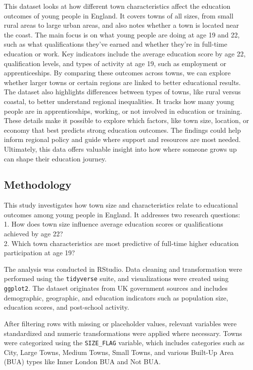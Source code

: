 \documentclass[
  letterpaper,
  DIV=11,
  numbers=noendperiod]{scrartcl}
\begin{document}
This dataset looks at how different town characteristics affect the
education outcomes of young people in England. It covers towns of all
sizes, from small rural areas to large urban areas, and also notes
whether a town is located near the coast. The main focus is on what
young people are doing at age 19 and 22, such as what qualifications
they've earned and whether they're in full-time education or work. Key
indicators include the average education score by age 22, qualification
levels, and types of activity at age 19, such as employment or
apprenticeships. By comparing these outcomes across towns, we can
explore whether larger towns or certain regions are linked to better
educational results. The dataset also highlights differences between
types of towns, like rural versus coastal, to better understand regional
inequalities. It tracks how many young people are in apprenticeships,
working, or not involved in education or training. These details make it
possible to explore which factors, like town size, location, or economy
that best predicts strong education outcomes. The findings could help
inform regional policy and guide where support and resources are most
needed. Ultimately, this data offers valuable insight into how where
someone grows up can shape their education journey.

\subsection{Methodology}\label{methodology}

This study investigates how town size and characteristics relate to
educational outcomes among young people in England. It addresses two
research questions:\\
1. How does town size influence average education scores or
qualifications achieved by age 22?\\
2. Which town characteristics are most predictive of full-time higher
education participation at age 19?

The analysis was conducted in RStudio. Data cleaning and transformation
were performed using the \texttt{tidyverse} suite, and visualizations
were created using \texttt{ggplot2}. The dataset originates from UK
government sources and includes demographic, geographic, and education
indicators such as population size, education scores, and post-school
activity.

After filtering rows with missing or placeholder values, relevant
variables were standardized and numeric transformations were applied
where necessary. Towns were categorized using the \texttt{SIZE\_FLAG}
variable, which includes categories such as City, Large Towns, Medium
Towns, Small Towns, and various Built-Up Area (BUA) types like Inner
London BUA and Not BUA.
\end{document}
